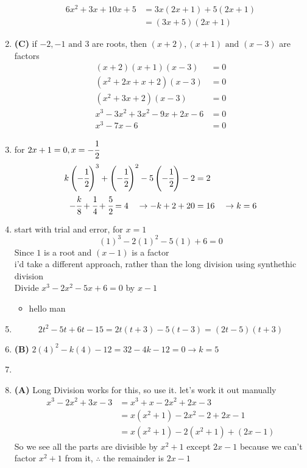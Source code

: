 \begin{multicols}{2}
\begin{enumerate}[label={\textbf{\arabic*.}}]
    \begin{align*} 6x^2 + 3x + 10x + 5 &= 3x(2x + 1) + 5(2x+1) \\ &= (3x+5)(2x+1) \end{align*}
    \item \textbf{(C)} if $-2, -1 \text{ and } 3$ are roots, then $(x+2), (x+1) \text{ and } (x-3)$ are factors 
        \begin{align*} 
            (x+2)(x+1)(x-3) &= 0 \\
            (x^2 + 2x + x + 2)(x-3) &= 0 \\
            (x^2 + 3x + 2)(x-3) &= 0 \\
            x^3 - 3x^2 +3x^2 - 9x + 2x -6 & = 0 \\
            x^3 -7x -6 & = 0 
        \end{align*}
    \item for $2x+1 = 0, x = -\cfrac{1}{2}$ \\
    \begin{align*} 
        k\left(-\cfrac{1}{2}\right)^3 + \left(-\cfrac{1}{2}\right)^2 - 5\left(-\cfrac{1}{2}\right) - 2 &= 2 \\
         -\cfrac{k}{8} + \cfrac{1}{4}+ \cfrac{5}{2}  = 4\hspace{10pt} \rightarrow -k + 2 + 20 &= 16 \hspace{10pt} \rightarrow k = 6
    \end{align*}
\item start with trial and error, for $x = 1$ 
    $$(1)^3 - 2(1)^2-5(1) + 6 = 0 $$ Since $1$ is a root and $(x-1)$ is a factor \\
    i'd take a different approach, rather than the long division using synthethic division \\ Divide $x^3 - 2x^2 - 5x + 6 = 0$ by $x-1$
     \begin{itemize}
        \item  hello man
     \end{itemize}

\item  
    $$2t^2 -5t + 6t - 15 = 2t(t + 3)-5(t-3) = (2t-5)(t+3)$$
\item \textbf{(B)} $2(4)^2 -k(4) -12 = 32-4k -12=0  \rightarrow k = 5$
\item 
\item \textbf{(A)} Long Division works for this, so use it. let's work it out manually 
    \begin{align*}
     x^3 -2x^2 + 3x - 3 &= x^3 + x -2x^2 + 2x -3 \\
     & = x(x^2 + 1) -2x^2 -2 + 2x -1 \\
     & = x(x^2 + 1) -2(x^2 + 1) + (2x -1)
    \end{align*}
So we see all the parts are divisible by $x^2 + 1$ except $2x-1$ because we can't factor $x^2 + 1$ from it, $\therefore $ the remainder is $2x -1$


\end{enumerate}
\end{multicols}
